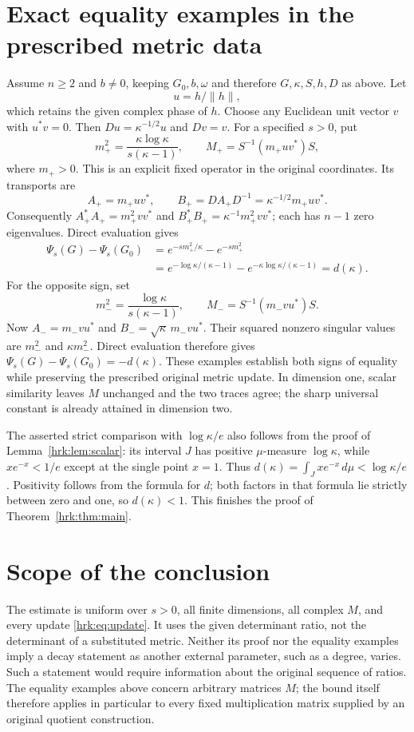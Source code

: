 \section{Exact equality examples in the prescribed metric data}
Assume $n\geq2$ and $b\ne0$, keeping $G_0,b,\omega$ and therefore
$G,\kappa,S,h,D$ as above. Let
\[
 u=h/\|h\|,
\]
which retains the given complex phase of $h$. Choose any Euclidean
unit vector $v$ with $u^*v=0$. Then
$Du=\kappa^{-1/2}u$ and $Dv=v$.
For a specified $s>0$, put
\begin{equation}\label{hrk:eq:positive-example}
 m_+^2=\frac{\kappa\log\kappa}{s(\kappa-1)},\qquad
 M_+=S^{-1}(m_+uv^*)S,
\end{equation}
where $m_+>0$. This is an explicit fixed operator in the original
coordinates. Its transports are
\[
 A_+=m_+uv^*,\qquad B_+=D A_+ D^{-1}
             =\kappa^{-1/2}m_+uv^*.
\]
Consequently $A_+^*A_+=m_+^2vv^*$ and
$B_+^*B_+=\kappa^{-1}m_+^2vv^*$; each has $n-1$ zero
eigenvalues. Direct evaluation gives
\begin{align*}
 \Psi_s(G)-\Psi_s(G_0)
 &= e^{-sm_+^2/\kappa}-e^{-sm_+^2}\\
 &=e^{-\log\kappa/(\kappa-1)}
     -e^{-\kappa\log\kappa/(\kappa-1)}
 =d(\kappa).
\end{align*}
For the opposite sign, set
\begin{equation}\label{hrk:eq:negative-example}
 m_-^2=\frac{\log\kappa}{s(\kappa-1)},\qquad
 M_-=S^{-1}(m_-vu^*)S.
\end{equation}
Now $A_-=m_-vu^*$ and $B_-=\sqrt\kappa\,m_-vu^*$.
Their squared nonzero singular values are $m_-^2$ and
$\kappa m_-^2$. Direct evaluation therefore gives
$\Psi_s(G)-\Psi_s(G_0)=-d(\kappa)$.
These examples establish both signs of equality while preserving
the prescribed original metric update. In dimension one, scalar
similarity leaves $M$ unchanged and the two traces agree; the sharp
universal constant is already attained in dimension two.

The asserted strict comparison with $\log\kappa/e$ also follows
from the proof of Lemma~\ref{hrk:lem:scalar}: its interval $J$ has
positive $\mu$-measure $\log\kappa$, while $xe^{-x}<1/e$ except
at the single point $x=1$. Thus
$d(\kappa)=\int_J xe^{-x}\,d\mu<\log\kappa/e$.
Positivity follows from the formula for $d$; both factors in that
formula lie strictly between zero and one, so $d(\kappa)<1$.
This finishes the proof of Theorem~\ref{hrk:thm:main}.

\section{Scope of the conclusion}
The estimate is uniform over $s>0$, all finite dimensions, all
complex $M$, and every update \eqref{hrk:eq:update}. It uses the given
determinant ratio, not the determinant of a substituted metric.
Neither its proof nor the equality examples imply a decay statement
as another external parameter, such as a degree, varies. Such a
statement would require information about the original sequence of
ratios. The equality examples above concern arbitrary matrices $M$;
the bound itself therefore applies in particular to every fixed
multiplication matrix supplied by an original quotient construction.


